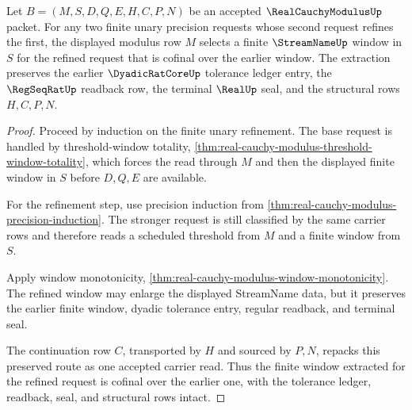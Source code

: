 \begin{theorem}
\label{thm:real-cauchy-modulus-cofinal-window-extraction}
Let $B=(M,S,D,Q,E,H,C,P,N)$ be an accepted $\RealCauchyModulusUp$ packet. For any two finite unary precision requests whose second request refines the first, the displayed modulus row $M$ selects a finite $\StreamNameUp$ window in $S$ for the refined request that is cofinal over the earlier window. The extraction preserves the earlier $\DyadicRatCoreUp$ tolerance ledger entry, the $\RegSeqRatUp$ readback row, the terminal $\RealUp$ seal, and the structural rows $H,C,P,N$.
\end{theorem}
\begin{proof}
Proceed by induction on the finite unary refinement. The base request is handled by threshold-window totality, \autoref{thm:real-cauchy-modulus-threshold-window-totality}, which forces the read through $M$ and then the displayed finite window in $S$ before $D,Q,E$ are available.

For the refinement step, use precision induction from \autoref{thm:real-cauchy-modulus-precision-induction}. The stronger request is still classified by the same carrier rows and therefore reads a scheduled threshold from $M$ and a finite window from $S$.

Apply window monotonicity, \autoref{thm:real-cauchy-modulus-window-monotonicity}. The refined window may enlarge the displayed StreamName data, but it preserves the earlier finite window, dyadic tolerance entry, regular readback, and terminal seal.

The continuation row $C$, transported by $H$ and sourced by $P,N$, repacks this preserved route as one accepted carrier read. Thus the finite window extracted for the refined request is cofinal over the earlier one, with the tolerance ledger, readback, seal, and structural rows intact.
\end{proof}

